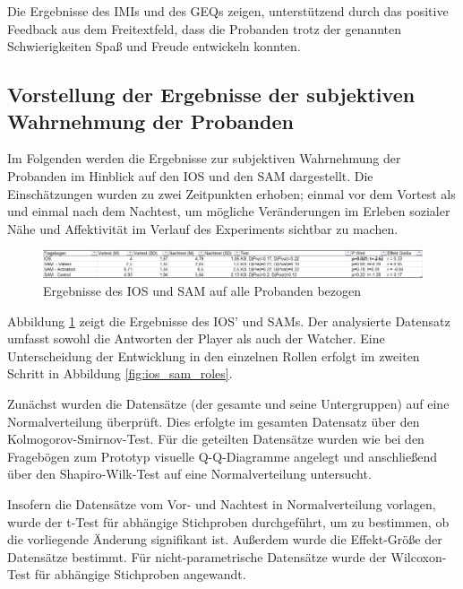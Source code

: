 Die Ergebnisse des \ac{IMI}s und des \ac{GEQ}s zeigen, unterstützend durch das positive Feedback aus dem Freitextfeld, dass die Probanden trotz der genannten Schwierigkeiten Spaß und Freude entwickeln konnten.

\subsection{Vorstellung der Ergebnisse der subjektiven Wahrnehmung der Probanden}
Im Folgenden werden die Ergebnisse zur subjektiven Wahrnehmung der Probanden im Hinblick auf den \ac{IOS} und den \ac{SAM} dargestellt. Die Einschätzungen wurden zu zwei Zeitpunkten erhoben; einmal vor dem Vortest als  und einmal nach dem Nachtest, um mögliche Veränderungen im Erleben sozialer Nähe und Affektivität im Verlauf des Experiments sichtbar zu machen.

\begin{figure}[ht]
\centering
\includegraphics[width=1\linewidth]{content/pictures/IOS_SAM_Overal.png}
\caption{Ergebnisse des \ac{IOS} und \ac{SAM} auf alle Probanden bezogen}
\label{fig:ios_sam_overal}
\end{figure}

Abbildung \ref{fig:ios_sam_overal} zeigt die Ergebnisse des \ac{IOS}' und \ac{SAM}s. Der analysierte Datensatz umfasst sowohl die Antworten der Player als auch der Watcher. Eine Unterscheidung der Entwicklung in den einzelnen Rollen erfolgt im zweiten Schritt in Abbildung \ref{fig:ios_sam_roles}.

Zunächst wurden die Datensätze (der gesamte und seine Untergruppen) auf eine Normalverteilung überprüft. Dies erfolgte im gesamten Datensatz über den  Kolmogorov-Smirnov-Test. %
Für die geteilten Datensätze wurden wie bei den Fragebögen zum Prototyp visuelle \ac{Q-Q}-Diagramme angelegt und anschließend über den Shapiro-Wilk-Test auf eine Normalverteilung untersucht.

Insofern die Datensätze vom Vor- und Nachtest in Normalverteilung vorlagen, wurde der t-Test für abhängige Stichproben durchgeführt, um zu bestimmen, ob die vorliegende Änderung signifikant ist. Außerdem wurde die Effekt-Größe der Datensätze bestimmt. Für nicht-parametrische Datensätze wurde der Wilcoxon-Test für abhängige Stichproben angewandt.

